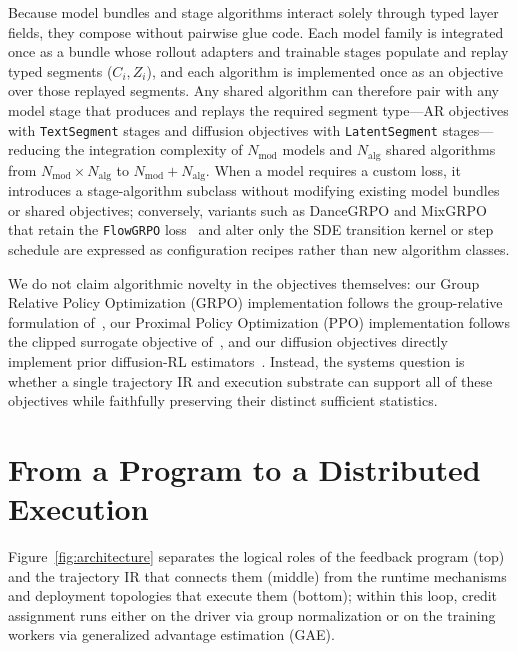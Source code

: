 \documentclass[10pt]{article}
\begin{document}
Because model bundles and stage algorithms interact solely through typed layer fields, they compose without pairwise glue code.
Each model family is integrated once as a bundle whose rollout adapters and trainable stages populate and replay typed segments ($C_i, Z_i$), and each algorithm is implemented once as an objective over those replayed segments.
Any shared algorithm can therefore pair with any model stage that produces and replays the required segment type---AR objectives with \texttt{TextSegment} stages and diffusion objectives with \texttt{LatentSegment} stages---reducing the integration complexity of $N_{\mathrm{mod}}$ models and $N_{\mathrm{alg}}$ shared algorithms from $N_{\mathrm{mod}}\times N_{\mathrm{alg}}$ to $N_{\mathrm{mod}}+N_{\mathrm{alg}}$.
When a model requires a custom loss, it introduces a stage-algorithm subclass without modifying existing model bundles or shared objectives; conversely, variants such as DanceGRPO and MixGRPO that retain the \texttt{FlowGRPO} loss~\citep{liu2025flowgrpo} and alter only the SDE transition kernel or step schedule are expressed as configuration recipes rather than new algorithm classes.

We do not claim algorithmic novelty in the objectives themselves: our Group Relative Policy Optimization (GRPO) implementation follows the group-relative formulation of~\citet{shao2024deepseekmath}, our Proximal Policy Optimization (PPO) implementation follows the clipped surrogate objective of~\citet{schulman2017ppo}, and our diffusion objectives directly implement prior diffusion-RL estimators~\citep{black2023ddpo,liu2025flowgrpo,xue2025dancegrpo,zheng2025diffusionnft}.
Instead, the systems question is whether a single trajectory IR and execution substrate can support all of these objectives while faithfully preserving their distinct sufficient statistics.

\section{From a Program to a Distributed Execution}
\label{sec:execution}

Figure~\ref{fig:architecture} separates the logical roles of the feedback program (top) and the trajectory IR that connects them (middle) from the runtime mechanisms and deployment topologies that execute them (bottom); within this loop, credit assignment runs either on the driver via group normalization or on the training workers via generalized advantage estimation (GAE).
\end{document}
